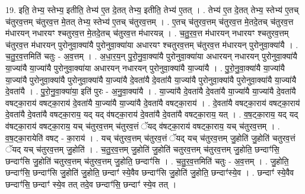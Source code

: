 \documentclass[17pt]{extarticle}
\begin{document}
19. इति॒ तेभ्य॒ स्तेभ्य॒ इतीति॒ तेभ्य॑ ए॒त दे॒तत् तेभ्य॒ इतीति॒ तेभ्य॑ ए॒तत् । . तेभ्य॑ ए॒त दे॒तत् तेभ्य॒ स्तेभ्य॑ ए॒तच् च॑तुरव॒त्तम् च॑तुरव॒त्त मे॒तत् तेभ्य॒ स्तेभ्य॑ ए॒तच् च॑तुरव॒त्तम् । . ए॒तच् च॑तुरव॒त्तम् च॑तुरव॒त्त मे॒तदे॒तच् च॑तुरव॒त्त म॑धारयन् नधारयꣳ श्चतुरव॒त्त मे॒तदे॒तच् च॑तुरव॒त्त म॑धारयन्न् । . च॒तु॒र॒व॒त्त म॑धारयन् नधारयꣳ श्चतुरव॒त्तम् च॑तुरव॒त्त म॑धारयन् पुरोनुवा॒क्या॑यै पुरोनुवा॒क्या॑या अधारयꣳ श्चतुरव॒त्तम् च॑तुरव॒त्त म॑धारयन् पुरोनुवा॒क्या॑यै । . च॒तु॒र॒व॒त्तमिति॑ चतुः - अ॒व॒त्तम् । . अ॒धा॒र॒य॒न् पु॒रो॒नु॒वा॒क्या॑यै पुरोनुवा॒क्या॑या अधारयन् नधारयन् पुरोनुवा॒क्या॑यै या॒ज्या॑यै या॒ज्या॑यै पुरोनुवा॒क्या॑या अधारयन् नधारयन् पुरोनुवा॒क्या॑यै या॒ज्या॑यै । . पु॒रो॒नु॒वा॒क्या॑यै या॒ज्या॑यै या॒ज्या॑यै पुरोनुवा॒क्या॑यै पुरोनुवा॒क्या॑यै या॒ज्या॑यै दे॒वता॑यै दे॒वता॑यै या॒ज्या॑यै पुरोनुवा॒क्या॑यै पुरोनुवा॒क्या॑यै या॒ज्या॑यै दे॒वता॑यै । . पु॒रो॒नु॒वा॒क्या॑या॒ इति॑ पुरः - अ॒नु॒वा॒क्या॑यै । . या॒ज्या॑यै दे॒वता॑यै दे॒वता॑यै या॒ज्या॑यै या॒ज्या॑यै दे॒वता॑यै वषट्का॒राय॑ वषट्का॒राय॑ दे॒वता॑यै या॒ज्या॑यै या॒ज्या॑यै दे॒वता॑यै वषट्का॒राय॑ । . दे॒वता॑यै वषट्का॒राय॑ वषट्का॒राय॑ दे॒वता॑यै दे॒वता॑यै वषट्का॒राय॒ यद् यद् व॑षट्का॒राय॑ दे॒वता॑यै दे॒वता॑यै वषट्का॒राय॒ यत् । . व॒ष॒ट्का॒राय॒ यद् यद् व॑षट्का॒राय॑ वषट्का॒राय॒ यच् च॑तुरव॒त्तम् च॑तुरव॒त्तं ॅयद् व॑षट्का॒राय॑ वषट्का॒राय॒ यच् च॑तुरव॒त्तम् । . व॒ष॒ट्का॒रायेति॑ वषट् - का॒राय॑ । . यच् च॑तुरव॒त्तम् च॑तुरव॒त्तं ॅयद् यच् च॑तुरव॒त्तम् जु॒होति॑ जु॒होति॑ चतुरव॒त्तं ॅयद् यच् च॑तुरव॒त्तम् जु॒होति॑ । . च॒तु॒र॒व॒त्तम् जु॒होति॑ जु॒होति॑ चतुरव॒त्तम् च॑तुरव॒त्तम् जु॒होति॒ छन्दाꣳ॑सि॒ छन्दाꣳ॑सि जु॒होति॑ चतुरव॒त्तम् च॑तुरव॒त्तम् जु॒होति॒ छन्दाꣳ॑सि । . च॒तु॒र॒व॒त्तमिति॑ चतुः - अ॒व॒त्तम् । . जु॒होति॒ छन्दाꣳ॑सि॒ छन्दाꣳ॑सि जु॒होति॑ जु॒होति॒ छन्दाꣳ॑ स्ये॒वैव छन्दाꣳ॑सि जु॒होति॑ जु॒होति॒ छन्दाꣳ॑स्ये॒व । . छन्दाꣳ॑ स्ये॒वैव छन्दाꣳ॑सि॒ छन्दाꣳ॑ स्ये॒व तत् तदे॒व छन्दाꣳ॑सि॒ छन्दाꣳ॑ स्ये॒व तत् । \newline
\end{document}
